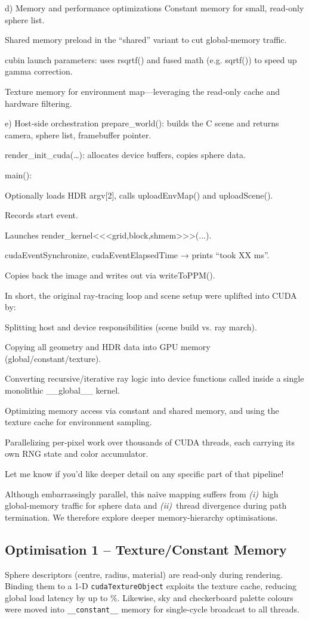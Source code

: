 d) Memory and performance optimizations
Constant memory for small, read-only sphere list.

Shared memory preload in the “shared” variant to cut global‐memory traffic.

cubin launch parameters: uses rsqrtf() and fused math (e.g. sqrtf()) to speed up gamma correction.

Texture memory for environment map—leveraging the read‐only cache and hardware filtering.

e) Host‐side orchestration
prepare\_world(): builds the C\+\+ scene and returns camera, sphere list, framebuffer pointer.

render\_init\_cuda(\dots): allocates device buffers, copies sphere data.

main():

Optionally loads HDR argv[2], calls uploadEnvMap() and uploadScene().

Records start event.

Launches render\_kernel<<<grid,block,shmem>>>(...).

cudaEventSynchronize, cudaEventElapsedTime → prints “took XX ms”.

Copies back the image and writes out via writeToPPM().

In short, the original ray‐tracing loop and scene setup were uplifted into CUDA by:

Splitting host and device responsibilities (scene build vs. ray march).

Copying all geometry and HDR data into GPU memory (global/constant/texture).

Converting recursive/iterative ray logic into device functions called inside a single monolithic \_\_global\_\_ kernel.

Optimizing memory access via constant and shared memory, and using the texture cache for environment sampling.

Parallelizing per‐pixel work over thousands of CUDA threads, each carrying its own RNG state and color accumulator.

Let me know if you’d like deeper detail on any specific part of that pipeline!

Although embarrassingly parallel, this naïve mapping suffers from
\emph{(i)}~high global-memory traffic for sphere data and
\emph{(ii)}~thread divergence during path termination.  We therefore
explore deeper memory-hierarchy optimisations.

\subsection{Optimisation 1 – Texture/Constant Memory}
Sphere descriptors (centre, radius, material) are read-only during
rendering.  Binding them to a 1-D \texttt{cudaTextureObject} exploits
the texture cache, reducing global load latency by up to
\%.  Likewise, sky and checkerboard palette
colours were moved into \texttt{\_\_constant\_\_} memory for single-cycle
broadcast to all threads.

